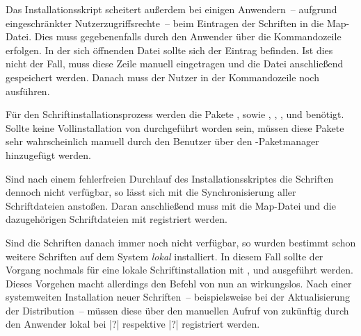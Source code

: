 Das Installationsskript scheitert außerdem bei einigen Anwendern~-- aufgrund 
eingeschränkter Nutzerzugriffsrechte~-- beim Eintragen der Schriften in die 
Map-Datei. Dies muss gegebenenfalls durch den Anwender über die Kommandozeile 
 erfolgen. In der sich öffnenden 
Datei sollte sich der Eintrag  befinden. Ist dies nicht 
der Fall, muss diese Zeile manuell eingetragen und die Datei anschließend 
gespeichert werden. Danach muss der Nutzer in der Kommandozeile noch 
 ausführen.


Für den Schriftinstallationsprozess werden die Pakete , 
 sowie , , 
,  und  benötigt. Sollte 
keine Vollinstallation von  durchgeführt worden 
sein, müssen diese Pakete sehr wahrscheinlich manuell durch den Benutzer über 
den -Paketmanager hinzugefügt werden.

Sind nach einem fehlerfreien Durchlauf des Installationsskriptes die Schriften 
dennoch nicht verfügbar, so lässt sich mit  
die Synchronisierung aller Schriftdateien anstoßen. Daran anschließend muss mit 
 die Map-Datei und die dazugehörigen 
Schriftdateien mit  registriert werden.

Sind die Schriften danach immer noch nicht verfügbar, so wurden bestimmt schon 
weitere Schriften auf dem System \emph{lokal} installiert. In diesem Fall 
sollte der Vorgang nochmals für eine lokale Schriftinstallation mit 
,  und 
 ausgeführt werden. Dieses Vorgehen macht allerdings den 
Befehl  von nun an wirkungslos. Nach einer systemweiten 
Installation neuer Schriften~-- beispielsweise bei der Aktualisierung der 
Distribution~-- müssen diese über den manuellen Aufruf von  
zukünftig durch den Anwender lokal bei |?| 
respektive |?| registriert werden.



